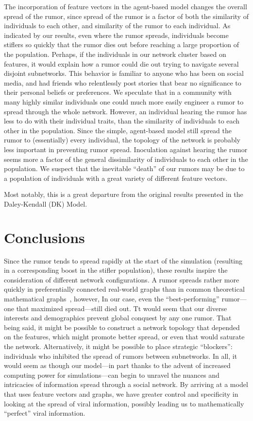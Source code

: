 The incorporation of feature vectors in the agent-based model changes the overall spread of the rumor, since spread of the rumor is a factor of both the similarity of individuals to each other, and similarity of the rumor to each individual.
As indicated by our results, even where the rumor spreads, individuals become stiflers so quickly that the rumor dies out before reaching a large proportion of the population.
Perhaps, if the individuals in our network cluster based on features, it would explain how a rumor could die out trying to navigate several disjoint subnetworks.
This behavior is familiar to anyone who has been on social media, and had friends who relentlessly post stories that bear no significance to their personal beliefs or preferences.
We speculate that in a community with many highly similar individuals one could much more easily engineer a rumor to spread through the whole network.
However, an individual hearing the rumor has less to do with their individual traits, than the similarity of individuals to each other in the population.
Since the simple, agent-based model still spread the rumor to (essentially) every individual, the topology of the network is probably less important in preventing rumor spread.
Inoculation against hearing the rumor seems more a factor of the general dissimilarity of individuals to each other in the population.
We suspect that the inevitable ``death'' of our rumors may be due to a population of individuals with a great variety of different feature vectors.

Most notably, this is a great departure from the original results presented in the Daley-Kendall (DK) Model.

\section{Conclusions}
\label{sec:conclusions}
Since the rumor tends to spread rapidly at the start of the simulation (resulting in a corresponding boost in the stifler population), these results inspire the consideration of different network configurations.
A rumor spreads rather more quickly in preferentially connected real-world graphs than in common theoretical mathematical graphs~\cite{doerr-2012}, however, In our case, even the ``best-performing'' rumor---one that maximized spread---still died out.
Tt would seem that our diverse interests and demographics prevent global conquest by any one rumor.
That being said, it might be possible to construct a network topology that depended on the features, which might promote better spread, or even that would saturate the network.
Alternatively, it might be possible to place strategic ``blockers'': individuals who inhibited the spread of rumors between subnetworks.
In all, it would seem as though our model---in part thanks to the advent of increased computing power for simulations---can begin to unravel the nuances and intricacies of information spread through a social network.
By arriving at a model that uses feature vectors and graphs, we have greater control and specificity in looking at the spread of viral information, possibly leading us to mathematically ``perfect'' viral information.

